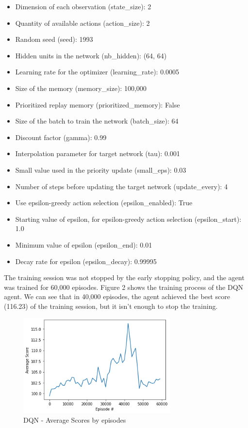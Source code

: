 \documentclass[letterpaper]{article}
\begin{document}
\begin{itemize}
    \item Dimension of each observation (state\_size): 2
    \item Quantity of available actions (action\_size): 2
    \item Random seed (seed): 1993
    \item Hidden units in the network (nb\_hidden): (64, 64)
    \item Learning rate for the optimizer (learning\_rate): 0.0005
    \item Size of the memory (memory\_size): 100,000
    \item Prioritized replay memory (prioritized\_memory): False
    \item Size of the batch to train the network (batch\_size): 64
    \item Discount factor (gamma): 0.99
    \item Interpolation parameter for target network (tau): 0.001
    \item Small value used in the priority update (small\_eps): 0.03
    \item Number of steps before updating the target network (update\_every): 4
    \item Use epsilon-greedy action selection (epsilon\_enabled): True
    \item Starting value of epsilon, for epsilon-greedy action selection (epsilon\_start): 1.0
    \item Minimum value of epsilon (epsilon\_end): 0.01
    \item Decay rate for epsilon (epsilon\_decay): 0.99995
\end{itemize}

The training session was not stopped by the early stopping policy, and the agent was trained for 60,000 episodes. Figure 2 shows the training process of the DQN agent. We can see that in 40,000 episodes, the agent achieved the best score (116.23) of the training session, but it isn't enough to stop the training.

\begin{figure}[ht]
    \centering
    \includegraphics[width=8cm]{images/DQN_score.png}
    \caption{DQN - Average Scores by episodes}
    \label{fig:DQN-avg-scores}
\end{figure}
\end{document}

